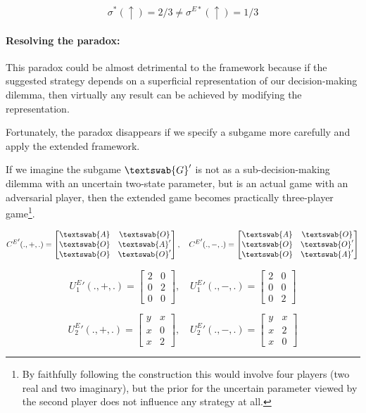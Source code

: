 \documentclass{article}
\begin{document}
\[
\sigma^*(\uparrow) = 2/3 \neq \sigma^{E*}(\uparrow) = 1/3
\]

\paragraph{Resolving the paradox:}
This paradox could be almost detrimental to the framework because if the suggested strategy depends on a superficial representation of our decision-making dilemma, then virtually any result can be achieved by modifying the representation.

Fortunately, the paradox disappears if we specify a subgame more carefully and apply the extended framework.

If we imagine the subgame $\textswab{G}'$ is not as a sub-decision-making dilemma with an uncertain two-state parameter, but is an actual game with an adversarial player, then the extended game becomes practically three-player game\footnote{By faithfully following the construction this would involve four players (two real and two imaginary), but the prior for the uncertain parameter viewed by the second player does not influence any strategy at all.}.


\[
{C^E}'(.,+,.)=
\begin{bmatrix}
\textswab{A} & \textswab{O} \\
\textswab{O} & \textswab{A}' \\
\textswab{O} & \textswab{O}'
\end{bmatrix}, \quad
{C^E}'(.,-,.)=
\begin{bmatrix}
\textswab{A} & \textswab{O} \\
\textswab{O} & \textswab{O}' \\
\textswab{O} & \textswab{A}'
\end{bmatrix}
\]

\[
{U^E_1}'(.,+,.)=
\begin{bmatrix}
2 & 0 \\
0 & 2 \\
0 & 0
\end{bmatrix}, \quad
{U^E_1}'(.,-,.)=
\begin{bmatrix}
2 & 0 \\
0 & 0 \\
0 & 2
\end{bmatrix}
\]

\[
{U^E_2}'(.,+,.)=
\begin{bmatrix}
y & x \\
x & 0 \\
x & 2
\end{bmatrix}, \quad
{U^E_2}'(.,-,.)=
\begin{bmatrix}
y & x \\
x & 2 \\
x & 0
\end{bmatrix}
\]
\end{document}
